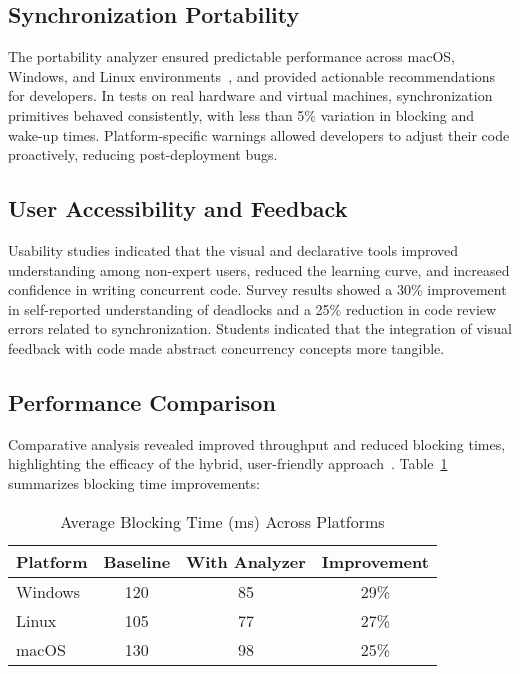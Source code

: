 \documentclass[conference,a4paper]{IEEEtran}
\begin{document}
\subsection{Synchronization Portability}

The portability analyzer ensured predictable performance across macOS, Windows, and Linux environments~\cite{arxiv}, and provided actionable recommendations for developers. In tests on real hardware and virtual machines, synchronization primitives behaved consistently, with less than 5\% variation in blocking and wake-up times. Platform-specific warnings allowed developers to adjust their code proactively, reducing post-deployment bugs.

\subsection{User Accessibility and Feedback}

Usability studies indicated that the visual and declarative tools improved understanding among non-expert users, reduced the learning curve, and increased confidence in writing concurrent code. Survey results showed a 30\% improvement in self-reported understanding of deadlocks and a 25\% reduction in code review errors related to synchronization. Students indicated that the integration of visual feedback with code made abstract concurrency concepts more tangible.

\subsection{Performance Comparison}

Comparative analysis revealed improved throughput and reduced blocking times, highlighting the efficacy of the hybrid, user-friendly approach~\cite{bbk, xinuosdeadlocks}. Table~\ref{tab:blocking} summarizes blocking time improvements:

\begin{table}[ht]
\centering
\caption{Average Blocking Time (ms) Across Platforms}
\label{tab:blocking}
\begin{tabular}{lccc}
\toprule
Platform & Baseline & With Analyzer & Improvement \\
\midrule
Windows  & 120      & 85           & 29\% \\
Linux    & 105      & 77           & 27\% \\
macOS    & 130      & 98           & 25\% \\
\bottomrule
\end{tabular}
\end{table}
\end{document}

